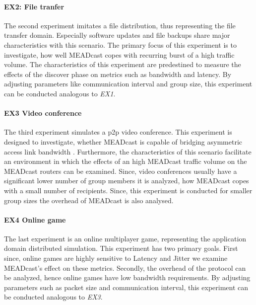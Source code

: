 \paragraph{EX2: File tranfer} %
\label{par:EX2: File tranfer}
The second experiment imitates a file distribution, thus representing the
    file transfer domain.
Especially software updates and file backups share major characteristics with
    this scenario.
The primary focus of this experiment is to investigate, how well MEADcast copes
    with recurring burst of a high traffic volume.
The characteristics of this experiment are predestined to measure the effects
    of the discover phase on metrics such as bandwidth and latency.
By adjusting parameters like communication interval and group size, this
    experiment can be conducted analogous to \textit{EX1}.

\paragraph{EX3 Video conference} %
\label{par:EX3 Video conference}
The third experiment simulates a \gls{p2p} video conference.
This experiment is designed to investigate, whether MEADcast is capable of
    bridging asymmetric access link bandwidth \cite{xcast_rfc}.
Furthermore, the characteristics of this scenario facilitate an environment
    in which the effects of an high MEADcast traffic volume on the MEADcast 
    routers can be examined.
Since, video conferences usually have a significant lower number of group
    members it is analyzed, how MEADcast copes with a small number of
    recipients.
Since, this experiment is conducted for smaller group sizes the overhead of 
    MEADcast is also analysed.

\paragraph{EX4 Online game} %
\label{par:EX4 Online game}
The last experiment is an online multiplayer game, representing the application
    domain distributed simulation.
This experiment has two primary goals.
First since, online games are highly sensitive to Latency and Jitter we examine
    MEADcast's effect on these metrics.
Secondly, the overhead of the protocol can be analyzed, hence online games have
    low bandwidth requirements.
By adjusting parameters such as packet size and communication interval, this
    experiment can be conducted analogous to \textit{EX3}.

